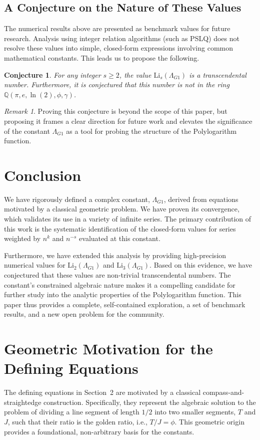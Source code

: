 \documentclass{amsart}
\theoremstyle{plain}
\newtheorem{conjecture}[theorem]{Conjecture}
\theoremstyle{definition}
\theoremstyle{remark}
\newtheorem*{remark}{Remark}
\newcommand{\LambdaG}{\Lambda_{G1}}
\begin{document}
\subsection{A Conjecture on the Nature of These Values}
The numerical results above are presented as benchmark values for future research. Analysis using integer relation algorithms (such as PSLQ) does not resolve these values into simple, closed-form expressions involving common mathematical constants. This leads us to propose the following.

\begin{conjecture}
For any integer $s \ge 2$, the value $\mathrm{Li}_s(\LambdaG)$ is a transcendental number. Furthermore, it is conjectured that this number is not in the ring $\mathbb{Q}(\pi, e, \ln(2), \phi, \gamma)$.
\end{conjecture}
\begin{remark}
Proving this conjecture is beyond the scope of this paper, but proposing it frames a clear direction for future work and elevates the significance of the constant $\LambdaG$ as a tool for probing the structure of the Polylogarithm function.
\end{remark}

\section{Conclusion}
We have rigorously defined a complex constant, $\LambdaG$, derived from equations motivated by a classical geometric problem. We have proven its convergence, which validates its use in a variety of infinite series. The primary contribution of this work is the systematic identification of the closed-form values for series weighted by $n^k$ and $n^{-s}$ evaluated at this constant.

Furthermore, we have extended this analysis by providing high-precision numerical values for $\mathrm{Li}_2(\LambdaG)$ and $\mathrm{Li}_3(\LambdaG)$. Based on this evidence, we have conjectured that these values are non-trivial transcendental numbers. The constant's constrained algebraic nature makes it a compelling candidate for further study into the analytic properties of the Polylogarithm function. This paper thus provides a complete, self-contained exploration, a set of benchmark results, and a new open problem for the community.

\appendix
\section{Geometric Motivation for the Defining Equations}
\label{app:A}
The defining equations in Section~2 are motivated by a classical compass-and-straightedge construction. Specifically, they represent the algebraic solution to the problem of dividing a line segment of length $1/2$ into two smaller segments, $T$ and $J$, such that their ratio is the golden ratio, i.e., $T/J = \phi$. This geometric origin provides a foundational, non-arbitrary basis for the constants.
\end{document}

